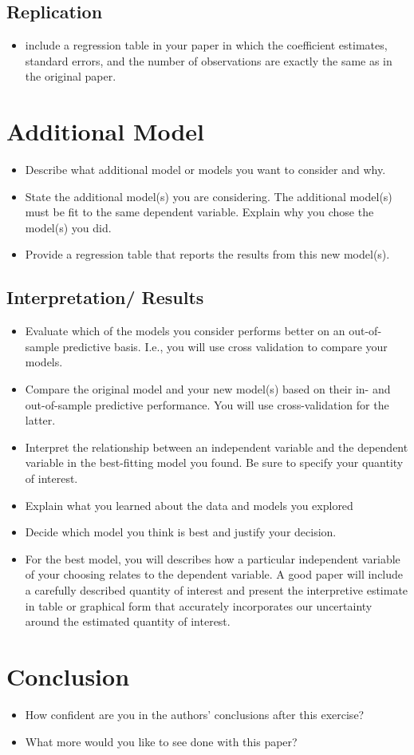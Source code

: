 \documentclass{article}
\begin{document}
\subsection{Replication}
\begin{itemize}
    \item include a regression table in your paper in which the coefficient estimates, standard errors, and the number of observations are exactly the same as in the original paper.
\end{itemize}

\section{Additional Model}
\begin{itemize}
\item Describe what additional model or models you want to consider and why.
\item State the additional model(s) you are considering.  The additional model(s) must be fit to the same dependent variable.  Explain why you chose the model(s) you did.
\item Provide a regression table that reports the results from this new model(s).
\end{itemize}

\subsection{Interpretation/ Results}
\begin{itemize}
\item Evaluate which of the models you consider performs better on an out-of-sample predictive basis.  I.e., you will use cross validation to compare your models. 
\item Compare the original model and your new model(s) based on their in- and out-of-sample predictive performance. You will use cross-validation for the latter.
\item Interpret the relationship between an independent variable and the dependent variable in the best-fitting model you found.  Be sure to specify your quantity of interest.
\item Explain what you learned about the data and models you explored 
\item Decide which model you think is best and justify your decision.
\item For the best model, you will describes how a particular independent variable of your choosing relates to the dependent variable.  A good paper will include a carefully described quantity of interest and present the interpretive estimate in table or graphical form that accurately incorporates our uncertainty around the estimated quantity of interest. 
\end{itemize}

\section{Conclusion}
\begin{itemize}
    \item How confident are you in the authors’ conclusions after this exercise? 
    \item What more would you like to see done with this paper?
\end{itemize}
\end{document}
